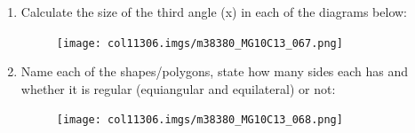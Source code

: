 \begin{table}[H]
\begin{enumerate}[noitemsep,
label=\textbf{\arabic*}. ]
	\begin{figure}[H] %
    \begin{center}
   
\label{m38380*id401231!!!underscore!!!media}\label{
m38380*id401231!!!underscore!!!printimage}\texttt{[image: 
col11306.imgs/m38380\_MG10C13\_066.png]} %
        
   
    
    \end{center}

 \end{figure}   

    \addtocounter{footnote}{-0}
    
        
\label{m38380*uid140}\item Calculate the size of the third angle (x) in each of
the diagrams below:

          
    \setcounter{subfigure}{0}


	\begin{figure}[H] %
    \begin{center}
   
\label{m38380*id401232!!!underscore!!!media}\label{
m38380*id401232!!!underscore!!!printimage}\texttt{[image: 
col11306.imgs/m38380\_MG10C13\_067.png]} %
        
    
    \end{center}

 \end{figure}   

    \addtocounter{footnote}{-0}
 \pagebreak   
        
\label{m38380*uid141}\item Name each of the shapes/polygons, state how many
sides each has and whether it is regular (equiangular and equilateral) or not:

          
    \setcounter{subfigure}{0}


	\begin{figure}[H] %
    \begin{center}
   
\label{m38380*id401233!!!underscore!!!media}\label{
m38380*id401233!!!underscore!!!printimage}\texttt{[image: 
col11306.imgs/m38380\_MG10C13\_068.png]} %
        

\end{center}
\end{figure}
\end{enumerate}
\end{table}

